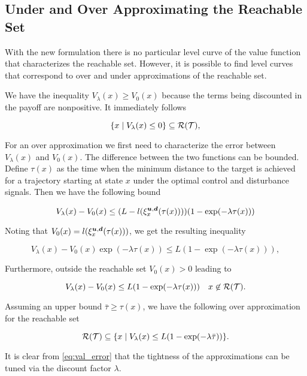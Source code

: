 \subsection{Under and Over Approximating the Reachable Set}
With the new formulation there is no particular level curve of the value function that characterizes the reachable set. However, it is possible to find level curves that correspond to over and under approximations of the reachable set. 

We have the inequality $V_{\lambda}(x) \geq V_0(x)$ because the terms being discounted in the payoff are nonpositive. It immediately follows

\begin{equation} \label{eq:reach_set}
\{x \mid V_{\lambda}(x) \le 0\} \subseteq \mathcal{R}(\mathcal{T}),
\end{equation}  

For an over approximation we first need to characterize the error between $V_{\lambda}(x)$ and $V_0(x)$. The difference between the two functions can be bounded. Define $\tau(x)$ as the time when the minimum distance to the target is achieved for a trajectory starting at state $x$ under the optimal control and disturbance signals. Then we have the following bound

\begin{equation}
V_{\lambda}(x) - V_0(x)  \leq (L - l(\xi_{x}^{\bm{u},\bm{d}}(\tau(x))))( 1 -  \exp(-\lambda \tau(x))) 
\end{equation}

\noindent Noting that $V_0(x)=l(\xi_{x}^{\bm{u},\bm{d}}(\tau(x)))$, we get the resulting inequality

\begin{equation} \label{eq:val_error}
V_{\lambda}(x) -  V_0(x) \exp(-\lambda \tau(x)) \leq L( 1 -  \exp(-\lambda \tau(x))), 
\end{equation}

\noindent Furthermore, outside the reachable set $V_0(x)>0$ leading to

\begin{equation}
V_{\lambda}(x) -  V_0(x)  \leq L( 1 -  \exp(-\lambda \tau(x))) \quad x \not\in \mathcal{R}(\mathcal{T}).
\end{equation}

Assuming an upper bound  $\bar{\tau} \geq \tau(x)$, we have the following over approximation for the reachable set

\begin{equation} \label{eq:reach_set}
\mathcal{R}(\mathcal{T}) \subseteq  \{x \mid V_{\lambda}(x) \le L( 1 -  \exp(-\lambda \bar{\tau})) \}.
\end{equation} 

It is clear from \eqref{eq:val_error} that the tightness of the approximations can be tuned via the discount factor $\lambda$.

